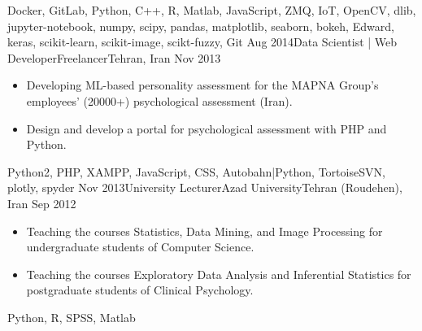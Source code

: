 \begin{experiences}
{\begin{itemize}
    \end{itemize}
  }
    {Docker, GitLab, Python, C++, R, Matlab, JavaScript, ZMQ, IoT, OpenCV, dlib, jupyter-notebook, numpy, scipy, pandas, matplotlib, seaborn, bokeh, Edward, keras, scikit-learn, scikit-image, scikt-fuzzy, Git}
    \emptySeparator
  \experience
  {Aug 2014}{Data Scientist | Web Developer}{Freelancer}{Tehran, Iran}
  {Nov 2013} {
    \begin{itemize}
      \item Developing ML-based personality assessment for the MAPNA Group's employees' (20000+) psychological assessment (Iran).

      \item Design and develop a portal for psychological assessment with PHP and Python.
    \end{itemize}
  }
    {Python2, PHP, XAMPP, JavaScript, CSS, Autobahn|Python, TortoiseSVN, plotly, spyder}
    \emptySeparator
  \experience
  {Nov 2013}{University Lecturer}{Azad University}{Tehran (Roudehen), Iran}
  {Sep 2012} {
    \begin{itemize}
      \item Teaching the courses Statistics, Data Mining, and Image Processing for undergraduate students of Computer Science.

      \item Teaching the courses Exploratory Data Analysis and Inferential Statistics for postgraduate students of Clinical Psychology.
    \end{itemize}
  }
    {Python, R, SPSS, Matlab}
\end{experiences}
